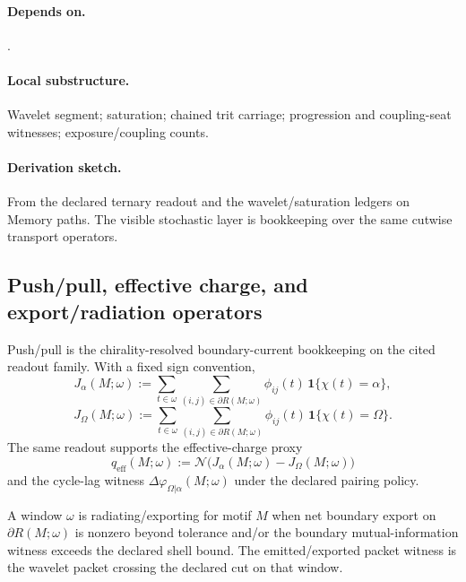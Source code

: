 \paragraph{Depends on.} .
\paragraph{Local substructure.} Wavelet segment; saturation; chained trit carriage; progression and coupling-seat witnesses; exposure/coupling counts.
\paragraph{Derivation sketch.} From the declared ternary readout and the wavelet/saturation ledgers on Memory paths. The visible stochastic layer is bookkeeping over the same cutwise transport operators.

\subsection{Push/pull, effective charge, and export/radiation operators}\label{subsec:pushpull-export-operators}
\begin{definition}
\label{def:push-pull-operator}
Push/pull is the chirality-resolved boundary-current bookkeeping on the cited readout family. With a fixed sign convention,
\[
J_\alpha(M;\omega):=\sum_{t\in\omega}\sum_{(i,j)\in\partial R(M;\omega)} \phi_{ij}(t)\,\mathbf 1\{\chi(t)=\alpha\},
\]
\[
J_\Omega(M;\omega):=\sum_{t\in\omega}\sum_{(i,j)\in\partial R(M;\omega)} \phi_{ij}(t)\,\mathbf 1\{\chi(t)=\Omega\}.
\]
The same readout supports the effective-charge proxy
\[
q_{\mathrm{eff}}(M;\omega):=\mathcal N\!\bigl(J_\alpha(M;\omega)-J_\Omega(M;\omega)\bigr)
\]
and the cycle-lag witness $\Delta\varphi_{\Omega|\alpha}(M;\omega)$ under the declared pairing policy.
\end{definition}

\begin{definition}
\label{def:radiation-operator}
A window $\omega$ is radiating/exporting for motif $M$ when net boundary export on $\partial R(M;\omega)$ is nonzero beyond tolerance and/or the boundary mutual-information witness exceeds the declared shell bound. The emitted/exported packet witness is the wavelet packet crossing the declared cut on that window.
\end{definition}

